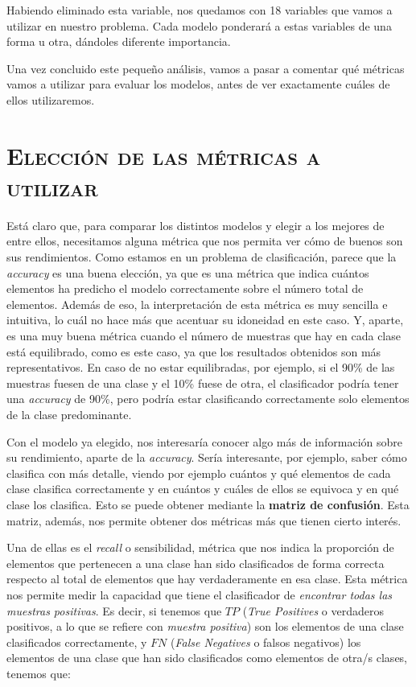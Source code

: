 \documentclass[11pt,a4paper]{article}
\begin{document}
Habiendo eliminado esta variable, nos quedamos con 18 variables que vamos a utilizar en nuestro problema. Cada modelo ponderará a estas
variables de una forma u otra, dándoles diferente importancia.

Una vez concluido este pequeño análisis, vamos a pasar a comentar qué métricas vamos a utilizar para evaluar los modelos, antes de ver
exactamente cuáles de ellos utilizaremos.

\newpage

\section{\textsc{Elección de las métricas a utilizar}}

Está claro que, para comparar los distintos modelos y elegir a los mejores de entre ellos, necesitamos alguna métrica que nos permita
ver cómo de buenos son sus rendimientos. Como estamos en un problema de clasificación, parece que la \textit{accuracy} es una buena
elección, ya que es una métrica que indica cuántos elementos ha predicho el modelo correctamente sobre el número total de elementos. Además
de eso, la interpretación de esta métrica es muy sencilla e intuitiva, lo cuál no hace más que acentuar su idoneidad en este caso. Y,
aparte, es una muy buena métrica cuando el número de muestras que hay en cada clase está equilibrado, como es este caso, ya que los
resultados obtenidos son más representativos. En caso de no estar equilibradas, por ejemplo, si el 90\% de las muestras fuesen de una clase
y el 10\% fuese de otra, el clasificador podría tener una \textit{accuracy} de 90\%, pero podría estar clasificando correctamente solo
elementos de la clase predominante.

Con el modelo ya elegido, nos interesaría conocer algo más de información sobre su rendimiento, aparte de la \textit{accuracy}. Sería
interesante, por ejemplo, saber cómo clasifica con más detalle, viendo por ejemplo cuántos y qué elementos de cada clase clasifica
correctamente y en cuántos y cuáles de ellos se equivoca y en qué clase los clasifica. Esto se puede obtener mediante la
\textbf{matriz de confusión}. Esta matriz, además, nos permite obtener dos métricas más que tienen cierto interés.

Una de ellas es el \textit{recall} o sensibilidad, métrica que nos indica la proporción de elementos que pertenecen a una clase han sido
clasificados de forma correcta respecto al total de elementos que hay verdaderamente en esa clase. Esta métrica nos permite medir la
capacidad que tiene el clasificador de \textit{encontrar todas las muestras positivas}\cite{bib:recall}. Es decir, si tenemos que $TP$
(\textit{True Positives} o verdaderos positivos, a lo que se refiere con \textit{muestra positiva}) son los elementos de una clase
clasificados correctamente, y $FN$ (\textit{False Negatives} o falsos negativos) los elementos de una clase que han sido clasificados como
elementos de otra/s clases, tenemos que:
\end{document}
